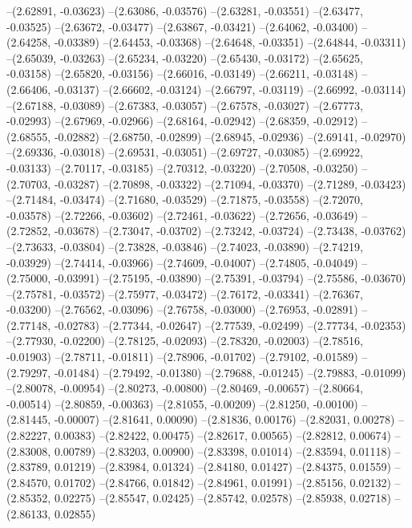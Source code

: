 --(2.62891, -0.03623)
--(2.63086, -0.03576)
--(2.63281, -0.03551)
--(2.63477, -0.03525)
--(2.63672, -0.03477)
--(2.63867, -0.03421)
--(2.64062, -0.03400)
--(2.64258, -0.03389)
--(2.64453, -0.03368)
--(2.64648, -0.03351)
--(2.64844, -0.03311)
--(2.65039, -0.03263)
--(2.65234, -0.03220)
--(2.65430, -0.03172)
--(2.65625, -0.03158)
--(2.65820, -0.03156)
--(2.66016, -0.03149)
--(2.66211, -0.03148)
--(2.66406, -0.03137)
--(2.66602, -0.03124)
--(2.66797, -0.03119)
--(2.66992, -0.03114)
--(2.67188, -0.03089)
--(2.67383, -0.03057)
--(2.67578, -0.03027)
--(2.67773, -0.02993)
--(2.67969, -0.02966)
--(2.68164, -0.02942)
--(2.68359, -0.02912)
--(2.68555, -0.02882)
--(2.68750, -0.02899)
--(2.68945, -0.02936)
--(2.69141, -0.02970)
--(2.69336, -0.03018)
--(2.69531, -0.03051)
--(2.69727, -0.03085)
--(2.69922, -0.03133)
--(2.70117, -0.03185)
--(2.70312, -0.03220)
--(2.70508, -0.03250)
--(2.70703, -0.03287)
--(2.70898, -0.03322)
--(2.71094, -0.03370)
--(2.71289, -0.03423)
--(2.71484, -0.03474)
--(2.71680, -0.03529)
--(2.71875, -0.03558)
--(2.72070, -0.03578)
--(2.72266, -0.03602)
--(2.72461, -0.03622)
--(2.72656, -0.03649)
--(2.72852, -0.03678)
--(2.73047, -0.03702)
--(2.73242, -0.03724)
--(2.73438, -0.03762)
--(2.73633, -0.03804)
--(2.73828, -0.03846)
--(2.74023, -0.03890)
--(2.74219, -0.03929)
--(2.74414, -0.03966)
--(2.74609, -0.04007)
--(2.74805, -0.04049)
--(2.75000, -0.03991)
--(2.75195, -0.03890)
--(2.75391, -0.03794)
--(2.75586, -0.03670)
--(2.75781, -0.03572)
--(2.75977, -0.03472)
--(2.76172, -0.03341)
--(2.76367, -0.03200)
--(2.76562, -0.03096)
--(2.76758, -0.03000)
--(2.76953, -0.02891)
--(2.77148, -0.02783)
--(2.77344, -0.02647)
--(2.77539, -0.02499)
--(2.77734, -0.02353)
--(2.77930, -0.02200)
--(2.78125, -0.02093)
--(2.78320, -0.02003)
--(2.78516, -0.01903)
--(2.78711, -0.01811)
--(2.78906, -0.01702)
--(2.79102, -0.01589)
--(2.79297, -0.01484)
--(2.79492, -0.01380)
--(2.79688, -0.01245)
--(2.79883, -0.01099)
--(2.80078, -0.00954)
--(2.80273, -0.00800)
--(2.80469, -0.00657)
--(2.80664, -0.00514)
--(2.80859, -0.00363)
--(2.81055, -0.00209)
--(2.81250, -0.00100)
--(2.81445, -0.00007)
--(2.81641, 0.00090)
--(2.81836, 0.00176)
--(2.82031, 0.00278)
--(2.82227, 0.00383)
--(2.82422, 0.00475)
--(2.82617, 0.00565)
--(2.82812, 0.00674)
--(2.83008, 0.00789)
--(2.83203, 0.00900)
--(2.83398, 0.01014)
--(2.83594, 0.01118)
--(2.83789, 0.01219)
--(2.83984, 0.01324)
--(2.84180, 0.01427)
--(2.84375, 0.01559)
--(2.84570, 0.01702)
--(2.84766, 0.01842)
--(2.84961, 0.01991)
--(2.85156, 0.02132)
--(2.85352, 0.02275)
--(2.85547, 0.02425)
--(2.85742, 0.02578)
--(2.85938, 0.02718)
--(2.86133, 0.02855)
